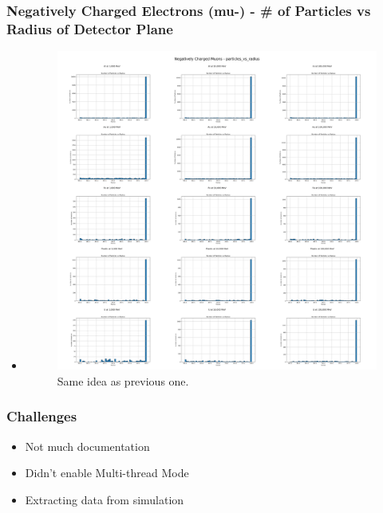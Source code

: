 \documentclass[aspectratio-169]{beamer}
\begin{document}
\begin{frame}
\frametitle{Negatively Charged Electrons (mu-) - \# of Particles vs Radius of Detector Plane}
\begin{itemize}
    \item 
    \begin{minipage}{0.5\textwidth}
        \begin{figure}
            \centering
            \includegraphics[width=\textwidth]{Combined Plots/particles_vs_radius_mu-.png}
            \footnotesize{Same idea as previous one.}
        \end{figure}
    \end{minipage}
\end{itemize}
\end{frame}


\begin{frame}
\frametitle{Challenges}
\begin{itemize}
\item Not much documentation
\item Didn't enable Multi-thread Mode
\item Extracting data from simulation
\end{itemize}
\end{frame}
\end{document}
